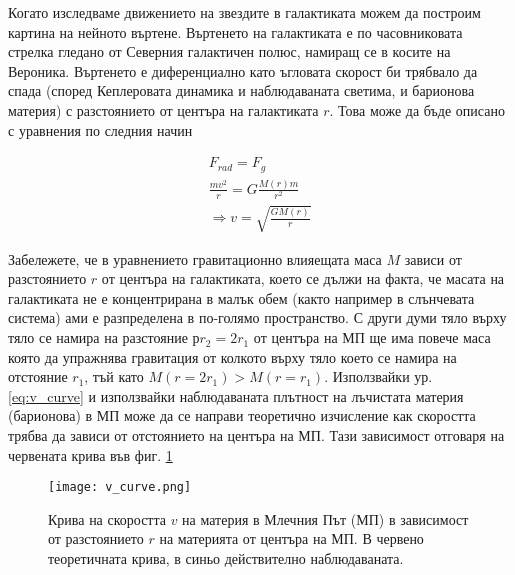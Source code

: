 \documentclass[a4paper,12pt]{article}
\begin{document}
Когато изследваме движението на звездите в галактиката можем да построим картина на нейното въртене. Въртенето на галактиката е по часовниковата стрелка гледано от Северния галактичен полюс, намиращ се в косите на Вероника. Въртенето е диференциално като ъгловата скорост би трябвало да спада (според Кеплеровата динамика и наблюдаваната светима, и барионова материя) с разстоянието от центъра на галактиката $r$. Това може да бъде описано с уравнения по следния начин

\begin{gather}
    F_{rad} = F_g\\
    \frac{mv^2}{r} = G \frac{M(r) m}{r^2}\\
    \label{eq:v_curve}
    \Rightarrow v = \sqrt{ \frac{GM(r) }{r} }
\end{gather}

Забележете, че в уравнението гравитационно влияещата маса $M$ зависи от разстоянието $r$ от центъра на галактиката, което се дължи на факта, че масата на галактиката не е концентрирана в малък обем (както например в слънчевата система) ами е разпределена в по-голямо пространство. С други думи тяло върху тяло се намира на разстояние $рr_2=2r_1$ от центъра на МП ще има повече маса която да упражнява гравитация от колкото върху тяло което се намира на отстояние $r_1$, тъй като $M(r=2r_1)>M(r=r_1)$. Използвайки ур. \eqref{eq:v_curve} и използвайки наблюдаваната плътност на лъчистата материя (барионова) в МП може да се направи теоретично изчисление как скоростта трябва да зависи от отстоянието на центъра на МП. Тази зависимост отговаря на червената крива във фиг. \ref{fig:v_curve}

\begin{figure}[h!]
\centering
\texttt{[image: v\_curve.png]}
\caption{Крива на скоростта $v$ на материя в Млечния Път (МП) в зависимост от разстоянието $r$ на материята от центъра на МП. В червено теоретичната крива, в синьо действително наблюдаваната.}
\label{fig:v_curve}
\end{figure}
\end{document}
